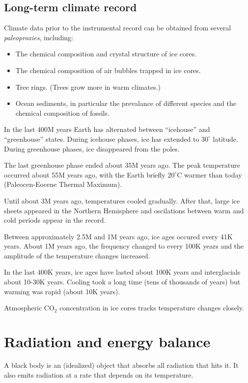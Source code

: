 \documentclass[11pt]{article}
\begin{document}
\subsection{Long-term climate record}

Climate data prior to the instrumental record can be obtained from several {\em paleoproxies}, including:

\begin{itemize}
    \item The chemical composition and crystal structure of ice cores.
    \item The chemical composition of air bubbles trapped in ice cores.
    \item Tree rings. (Trees grow more in warm climates.)
    \item Ocean sediments, in particular the prevalance of different species and the chemical
        composition of  fossils.
\end{itemize}

In the last 400M years Earth has alternated between ``icehouse'' and ``greenhouse'' states.
During icehouse phases, ice has extended to $30^\circ$ latitude. During greenhouse phases,
ice disappeared from the poles.

The last greenhouse phase ended about 35M years ago. The peak temperature occurred about 55M years ago,
with the Earth briefly $20^\circ$C warmer than today (Paleocen-Eocene Thermal Maximum).

Until about 3M years ago, temperatures cooled gradually. After that, large ice sheets appeared in the
Northern Hemisphere and oscilations between warm and cold periods appear in the record.

Between approximately 2.5M and 1M years ago, ice ages occured every 41K years. About 1M years ago,
the frequency changed to every 100K years and the amplitude of the temperature changes increased.

In the last 400K years, ice ages have lasted about 100K years and interglacials about 10-30K years.
Cooling took a long time (tens of thousands of years) but warming was rapid (about 10K years).

Atmospheric CO$_2$ concentration in ice cores tracks temperature changes closely.

\section{Radiation and energy balance}

A black body is an (idealized) object that absorbs all radiation that hits it.
It also emits radiation at a rate that depends on its temperature.
\end{document}
